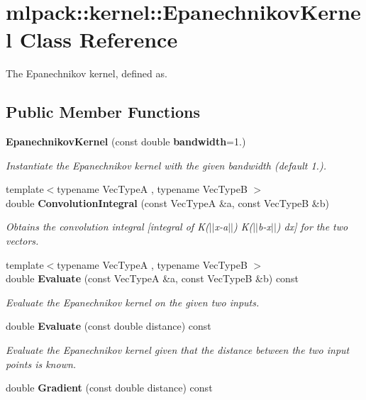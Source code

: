 \section{mlpack\+:\+:kernel\+:\+:Epanechnikov\+Kernel Class Reference}
\label{classmlpack_1_1kernel_1_1EpanechnikovKernel}


The Epanechnikov kernel, defined as.  


\subsection*{Public Member Functions}
\begin{DoxyCompactItemize}
\item 
{\bf Epanechnikov\+Kernel} (const double {\bf bandwidth}=1.)
\begin{DoxyCompactList}\small\item\em Instantiate the Epanechnikov kernel with the given bandwidth (default 1.). \end{DoxyCompactList}\item 
{\footnotesize template$<$typename Vec\+TypeA , typename Vec\+TypeB $>$ }\\double {\bf Convolution\+Integral} (const Vec\+TypeA \&a, const Vec\+TypeB \&b)
\begin{DoxyCompactList}\small\item\em Obtains the convolution integral [integral of K($\vert$$\vert$x-\/a$\vert$$\vert$) K($\vert$$\vert$b-\/x$\vert$$\vert$) dx] for the two vectors. \end{DoxyCompactList}\item 
{\footnotesize template$<$typename Vec\+TypeA , typename Vec\+TypeB $>$ }\\double {\bf Evaluate} (const Vec\+TypeA \&a, const Vec\+TypeB \&b) const 
\begin{DoxyCompactList}\small\item\em Evaluate the Epanechnikov kernel on the given two inputs. \end{DoxyCompactList}\item 
double {\bf Evaluate} (const double distance) const 
\begin{DoxyCompactList}\small\item\em Evaluate the Epanechnikov kernel given that the distance between the two input points is known. \end{DoxyCompactList}\item 
double {\bf Gradient} (const double distance) const 

\end{DoxyCompactItemize}
